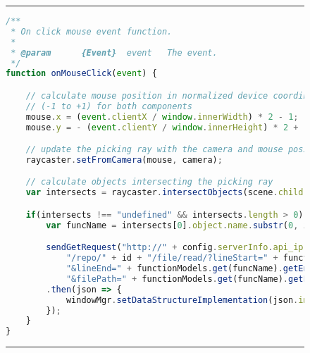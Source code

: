 
\begin{figure}[H]
\noindent\rule{\textwidth}{1pt}
\begin{lstlisting}[language=JavaScript, caption={Shows a snippet of \gls{raycasting} onMouseClick}, label={lst:onClick}]
/**
 * On click mouse event function.
 *
 * @param      {Event}  event   The event.
 */
function onMouseClick(event) {

    // calculate mouse position in normalized device coordinates
    // (-1 to +1) for both components
    mouse.x = (event.clientX / window.innerWidth) * 2 - 1;
    mouse.y = - (event.clientY / window.innerHeight) * 2 + 1;

    // update the picking ray with the camera and mouse position
    raycaster.setFromCamera(mouse, camera);

    // calculate objects intersecting the picking ray
    var intersects = raycaster.intersectObjects(scene.children ,true);

    if(intersects !== "undefined" && intersects.length > 0) {
        var funcName = intersects[0].object.name.substr(0, intersects[0].object.name.indexOf(' |'));

        sendGetRequest("http://" + config.serverInfo.api_ip + ":" + config.serverInfo.api_port +
            "/repo/" + id + "/file/read/?lineStart=" + functionModels.get(funcName).getStartLine() +
            "&lineEnd=" + functionModels.get(funcName).getEndLine() +
            "&filePath=" + functionModels.get(funcName).getFileName())
        .then(json => {
            windowMgr.setDataStructureImplementation(json.implementation);
        });
    }
}
\end{lstlisting}
\noindent\rule{\textwidth}{1pt}
\end{figure}